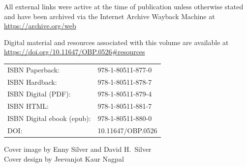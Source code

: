 \begin{flushleft}
\vspace{1em}
All external links were active at the time of publication unless otherwise stated and have been archived via the Internet Archive Wayback Machine at\\
\url{https://archive.org/web}

\vspace{1em}
Digital material and resources associated with this volume are available at\\
\url{https://doi.org/10.11647/OBP.0526\#resources}

\vspace{1em}
\begin{tabular}{@{}ll}
ISBN Paperback: & 978-1-80511-877-0 \\
ISBN Hardback:  & 978-1-80511-878-7 \\
ISBN Digital (PDF): & 978-1-80511-879-4 \\
ISBN HTML:      & 978-1-80511-881-7 \\
ISBN Digital ebook (epub): & 978-1-80511-880-0 \\
DOI:            & 10.11647/OBP.0526 \\
\end{tabular}

\vspace{1em}
Cover image by Enny Silver and David H.\ Silver\\
Cover design by Jeevanjot Kaur Nagpal

\end{flushleft}
\vfill
\clearpage
